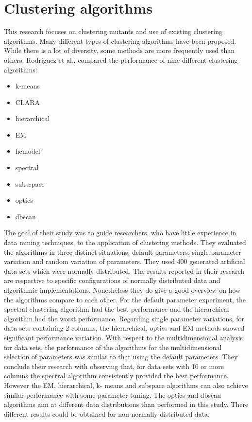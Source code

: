 \documentclass[../main]{subfiles}
\begin{document}
\section{Clustering algorithms}
This research focuses on clustering mutants and use of existing clustering algorithms. 
Many different types of clustering algorithms have been proposed\cite{Rodriguez2019}. While there is a lot of diversity, some methods are more frequently used than others\cite{Wu2008TopMining}. 
Rodriguez et al., compared the performance of nine different clustering algorithms:
\begin{itemize}
    \item k-means
    \item CLARA
    \item hierarchical
    \item EM
    \item hcmodel
    \item spectral
    \item subscpace
    \item optics
    \item dbscan
\end{itemize}
The goal of their study was to guide researchers, who have little experience in data mining techniques, to the application of clustering methods.
They evaluated the algorithms in three distinct situations: default parameters, single parameter variation and random variation of parameters.
They used 400 generated artificial data sets which were normally distributed.
\newline
The results reported in their research are respective to specific configurations of normally distributed data and algorithmic implementations.
Nonetheless they do give a good overview on how the algorithms compare to each other.
\newline
For the default parameter experiment, the spectral clustering algorithm had the best performance and the hierarchical algorithm had the worst performance.
\newline
Regarding single parameter variations, for data sets containing 2 columns, the hierarchical, optics and EM methods showed significant performance variation.
\newline
With respect to the multidimensional analysis for data sets, the performance of the algorithms for the multidimensional selection of parameters was similar to that using the default parameters.
They conclude their research with observing that, for data sets with 10 or more columns the spectral algorithm consistently provided the best performance.
However the EM, hierarchical, k- means and subspace algorithms can also achieve similar performance with some parameter tuning.
The optics and dbscan algorithms aim at different data distributions than performed in this study. There different results could be obtained for non-normally distributed data.
\end{document}
